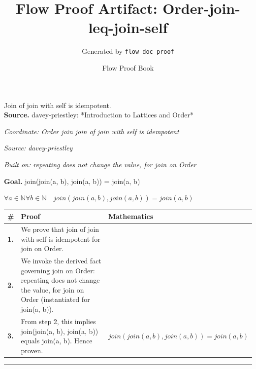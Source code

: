 \documentclass[11pt]{article}
\title{Flow Proof Artifact: Order-join-leq-join-self}
\author{Generated by \texttt{flow doc proof}}
\date{Flow Proof Book}
\theoremstyle{definition}
\begin{document}
\maketitle
Join of join with self is idempotent.\\[0.5em]
\textbf{Source.} davey-priestley: *Introduction to Lattices and Order*\\[0.5em]
\bigskip
{}\par
\smallskip\noindent\textit{Coordinate: Order \cdot join \cdot join of join with self is idempotent}\par
\smallskip\noindent\textit{Source: davey-priestley}\par
\smallskip\noindent\textit{Built on: repeating does not change the value, for join on Order}\par
\medskip
\noindent\textbf{Goal.} join(join(a, b), join(a, b)) = join(a, b)\par
\noindent$\displaystyle \forall a \in \mathbb{N} \forall b \in \mathbb{N}\quad join(join(a, b), join(a, b)) = join(a, b)$\par
\medskip
\noindent
\begin{tabular}{@{} >{\raggedright\arraybackslash}p{} >{\raggedright\arraybackslash}p{} >{\raggedleft\arraybackslash}p{} @{}}
\textbf{\#} & \textbf{Proof} & \textbf{Mathematics} \\
\midrule
\textbf{1.} & We prove that join of join with self is idempotent for join on Order. & \\[0.45em]
\textbf{2.} & We invoke the derived fact governing join on Order: repeating does not change the value, for join on Order (instantiated for join(a, b)). & \\[0.45em]
\textbf{3.} & From step 2, this implies join(join(a, b), join(a, b)) equals join(a, b). Hence proven. & $\displaystyle join(join(a, b), join(a, b)) = join(a, b)$ \\[0.45em]
\bottomrule
\end{tabular}
\label{thm:Order-join-join_of_join_with_self_is_idempotent}
\par\medskip\hrule
\end{document}
